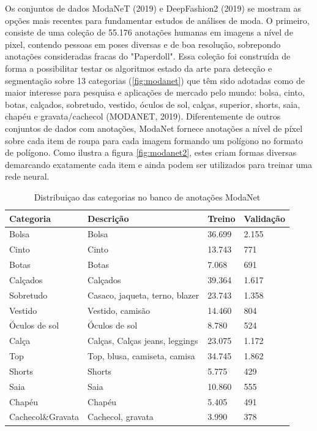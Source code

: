 \documentclass[12pt]{report}
\begin{document}

Os conjuntos de dados ModaNeT (2019) e DeepFashion2 (2019) se mostram as opções mais recentes para fundamentar estudos de análises de moda. O primeiro, consiste de uma coleção de 55.176 anotações humanas em imagens a nível de pixel, contendo pessoas em poses diversas e de boa resolução, sobrepondo anotações consideradas fracas do "Paperdoll". Essa coleção foi construída de forma a possibilitar testar os algoritmos estado da arte para detecção e segmentação sobre 13 categorias (\ref{fig:modanet}) que têm sido adotadas como de maior interesse para pesquisa e aplicações de mercado pelo mundo: bolsa, cinto, botas, calçados, sobretudo, vestido, óculos de sol, calças, superior, shorts, saia, chapéu e gravata/cachecol (MODANET, 2019). Diferentemente de outros conjuntos de dados com anotações, ModaNet fornece anotações a nível de píxel sobre cada item de roupa para cada imagem formando um polígono no formato de polígono. Como ilustra a figura \ref{fig:modanet2}, estes criam formas diversas demarcando exatamente cada item e ainda podem ser utilizados para treinar uma rede neural. 

\begin{table}[]
\centering
\begin{tabular}{@{}llll@{}}
\toprule
Categoria         & Descrição                      & Treino & Validação \\ \midrule
Bolsa             & Bolsa                          & 36.699 & 2.155     \\
Cinto             & Cinto                          & 13.743 & 771       \\
Botas             & Botas                          & 7.068  & 691       \\
Calçados          & Calçados                       & 39.364 & 1.617     \\
Sobretudo         & Casaco, jaqueta, terno, blazer & 23.743 & 1.358     \\
Vestido           & Vestido, camisão               & 14.460 & 804       \\
Óculos de sol     & Óculos de sol                  & 8.780  & 524       \\
Calça             & Calças, Calças jeans, leggings & 23.075 & 1.172     \\
Top               & Top, blusa, camiseta, camisa   & 34.745 & 1.862     \\
Shorts            & Shorts                         & 5.775  & 429       \\
Saia              & Saia                           & 10.860 & 555       \\
Chapéu            & Chapéu                         & 5.405  & 491       \\
Cachecol\&Gravata & Cachecol, gravata              & 3.990  & 378       \\ \bottomrule
\end{tabular}
\caption{Distribuiçao das categorias no banco de anotações ModaNet}
\label{table:estat}
\end{table}
\end{document}
